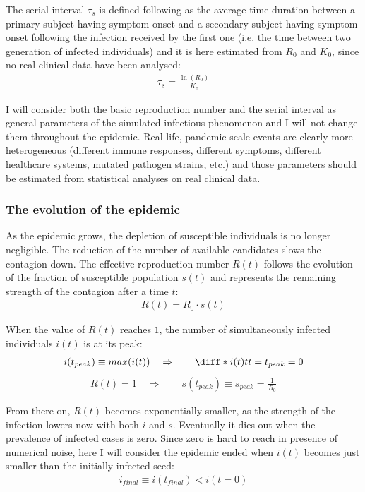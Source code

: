 \documentclass[DIV=12, BCOR=0pt]{scrartcl}  %
\begin{document}
	The serial interval $\tau_s$ is defined following \citet{Du2020} as the average time duration between a primary subject having symptom onset and a secondary subject having symptom onset following the infection received by the first one (i.e. the time between two generation of infected individuals) and it is here estimated from $R_0$ and $K_0$, since no real clinical data have been analysed: 
	\begin{align}
		\tau_s = \frac{\ln(R_0)}{K_0}
		\label{eq:serial}
	\end{align}

	I will consider both the basic reproduction number and the serial interval as general parameters of the simulated infectious phenomenon and I will not change them throughout the epidemic. Real-life, pandemic-scale events are clearly more heterogeneous (different immune responses, different symptoms, different healthcare systems, mutated pathogen strains, etc.) and those parameters should be estimated from statistical analyses on real clinical data.  

  \subsubsection{The evolution of the epidemic}
  As the epidemic grows, the depletion of susceptible individuals is no longer negligible. The reduction of the number of available candidates slows the contagion down.
  The effective reproduction number $R(t)$ follows the evolution of the fraction of susceptible population $s(t)$ and represents the remaining strength of the contagion after a time $t$:
  \begin{align}
		R(t) = R_0 \cdot s(t) 
		\label{eq:Rt}
  \end{align}

  When the value of $R(t)$ reaches $1$, the number of simultaneously infected individuals $i(t)$ is at its peak:
  \begin{align}
  	i(t_{peak}) \equiv max(i(t)) \quad \Rightarrow \qquad \diff*{i(t)}{t}{t = t_{peak}} = 0
  	\label{eq:peak}
  \end{align}
	\begin{align}
		R(t) = 1 \quad \Rightarrow \qquad s(t_{peak}) \equiv s_{peak} = \frac{1}{R_0}
	\end{align}

From there on, $R(t)$  becomes exponentially smaller, as the strength of the infection lowers now with both $i$ and $s$. Eventually it dies out when the prevalence of infected cases is zero. Since zero is hard to reach in presence of numerical noise, here I will consider the epidemic ended when $i(t)$ becomes just smaller than the initially infected seed:
\begin{align}
	i_{final} \equiv i(t_{final}) < i(t \! = \! 0)
\end{align}
\end{document}
